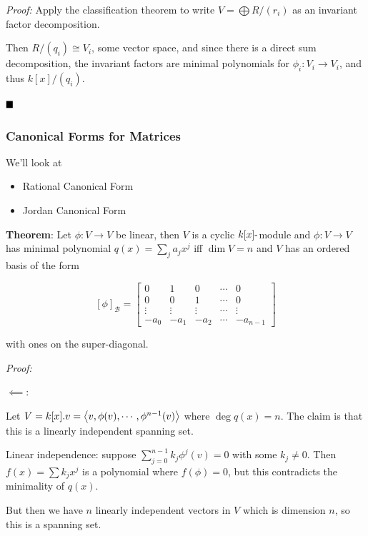 \emph{Proof:} Apply the classification theorem to write
\(V = \bigoplus R/(r_i)\) as an invariant factor decomposition.

Then \(R/(q_i) \cong V_i\), some vector space, and since there is a
direct sum decomposition, the invariant factors are minimal polynomials
for \(\phi_i: V_i \to V_i\), and thus \(k[x]/(q_i)\).

\(\qed\)

\hypertarget{canonical-forms-for-matrices}{%
\subsubsection{Canonical Forms for
Matrices}\label{canonical-forms-for-matrices}}

We'll look at

\begin{itemize}
\item
  Rational Canonical Form
\item
  Jordan Canonical Form
\end{itemize}

\textbf{Theorem}: Let \(\phi: V\to V\) be linear, then \(V\) is a cyclic
\(k[x]{\hbox{-}}\)module and \(\phi: V\to V\) has minimal polynomial
\(q(x) = \sum_j a_j x^j\) iff \(\dim V = n\) and \(V\) has an ordered
basis of the form

\[
[\phi]_{\mathcal{B}} = \left[
\begin{array}{ccccc}
0 & 1 & 0 & \cdots & 0 \\
0 & 0 & 1 & \cdots & 0 \\
\vdots & \vdots & \vdots & \cdots & \vdots \\
-a_0 & -a_1 & -a_2 & \cdots & -a_{n-1}
\end{array}
\right]
\]

with ones on the super-diagonal.

\emph{Proof:}

\(\impliedby\):

Let \(V = k[x].v = \left\langle{v, \phi(v), \cdots, \phi^{n-1}(v)}\right\rangle\)
where \(\deg q(x) = n\). The claim is that this is a linearly
independent spanning set.

Linear independence: suppose \(\sum_{j=0}^{n-1} k_j \phi^j(v) = 0\) with
some \(k_j \neq 0\). Then \(f(x) = \sum k_j x^j\) is a polynomial where
\(f(\phi) = 0\), but this contradicts the minimality of \(q(x)\).

But then we have \(n\) linearly independent vectors in \(V\) which is
dimension \(n\), so this is a spanning set.

